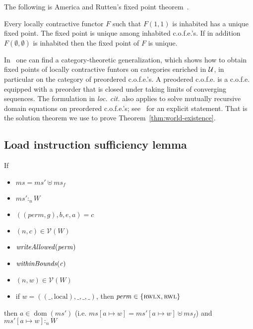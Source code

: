 \documentclass[format=acmsmall, review=true, screen=true]{acmart}
\newcommand{\update}[2]{[#1 \mapsto #2]}
\DeclareMathOperator{\dom}{dom}
\newcommand{\var}[1]{\mathit{#1}}
\newcommand{\hs}{\var{ms}}
\newcommand{\ms}{\hs}
\newcommand{\gl}{\var{g}}
\newcommand{\addr}{\var{a}}
\newcommand{\start}{\var{b}}
\newcommand{\addrend}{\var{e}}
\newcommand{\heap}{\var{mem}}
\newcommand{\perm}{\var{perm}}
\newcommand{\plainfun}[2]{
  \ifthenelse{\equal{#2}{}}
  {\mathit{#1}}
  {\mathit{#1}(#2)}
}
\newcommand{\writeAllowed}[1]{\plainfun{writeAllowed}{#1}}
\newcommand{\withinBounds}[1]{\plainfun{withinBounds}{#1}}
\newcommand{\heapSat}[3][\heap]{#1 :_{#2} #3}
\newcommand{\asmType}{\plaindom{AsmType}}
\newcommand{\plaindom}[1]{\mathrm{#1}}
\newcommand{\intr}[2]{\mathcal{#1}}
\newcommand{\valueintr}[1]{\intr{V}{#1}}
\newcommand{\stdvr}{\valueintr{\asmType}}
\newcommand{\npair}[2][n]{\left(#1,#2 \right)}
\newcommand{\plainperm}[1]{\textsc{#1}}
\newcommand{\readwritel}{\plainperm{rwl}}
\newcommand{\rwlx}{\plainperm{rwlx}}
\newcommand{\plainlocality}[1]{\mathrm{#1}}
\newcommand{\local}{\plainlocality{local}}
\begin{document}
The following is America and Rutten's fixed point theorem~\citep{America-Rutten:JCSS89}.
\begin{theorem}
 \label{thm:contr-functors-have-fixed-points}
 Every locally contractive functor $F$ such that $F(1, 1)$ is inhabited has a unique fixed
 point. The fixed point is unique among inhabited c.o.f.e.'s.
 If in addition $F(\emptyset, \emptyset)$ is inhabited then the fixed point of $F$ is unique.
\end{theorem}
In~\citet{BirkedalL:metric-enriched-journal} one can find a
category-theoretic generalization, which shows how to obtain fixed
points of locally contractive funtors on categories enriched in $\mathcal{U}$,
in particular on the category of preordered c.o.f.e.'s.  A preodered c.o.f.e. is
a c.o.f.e. equipped with a preorder that is closed under taking limits of
converging sequences.
The formulation in \emph{loc. cit.} also applies to solve
mutually recursive domain equations on preordered c.o.f.e.'s; see~\citet{bizjak:mutually-recursive-mcat}
for an explicit statement. That is the solution theorem we use to prove
Theorem~\ref{thm:world-existence}.



\subsection{Load instruction sufficiency lemma}
 \begin{lemma}
   \label{lem:conds-store-suff}
   If 
   \begin{itemize}
   \item $\ms = \ms' \uplus \ms_f$
   \item $\heapSat[\ms']{n}{W}$
   \item $((\perm,\gl),\start,\addrend,\addr) = c$
   \item $\npair{c}\in\stdvr(W)$
   \item $\writeAllowed{\perm}$
   \item $\withinBounds{\var{c}}$
   \item $\npair{\var{w}}\in\stdvr(W)$
   \item if $\var{w} = ((\_,\local),\_,\_,\_)$, then $\perm \in
     \{\rwlx,\readwritel \}$
   \end{itemize}
 
   then $\addr \in \dom(\ms')$ (i.e. $\ms\update{a}{w} =
   \ms'\update{a}{w}\uplus\ms_f$) and
   $\heapSat[{\ms'\update{\addr}{\var{w}}}]{n}{W}$
 \end{lemma}
\end{document}
